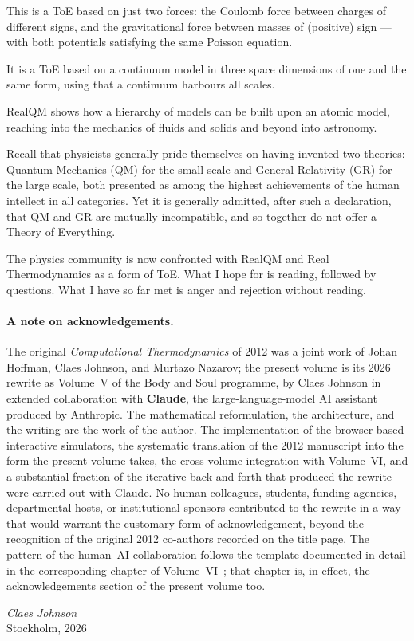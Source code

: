 This is a ToE based on just two forces: the Coulomb force between charges of
different signs, and the gravitational force between masses of (positive) sign
--- with both potentials satisfying the same Poisson equation.

It is a ToE based on a continuum model in three space dimensions of one and the
same form, using that a continuum harbours all scales.

RealQM shows how a hierarchy of models can be built upon an atomic model,
reaching into the mechanics of fluids and solids and beyond into astronomy.

Recall that physicists generally pride themselves on having invented two
theories: Quantum Mechanics (QM) for the small scale and General Relativity
(GR) for the large scale, both presented as among the highest achievements of
the human intellect in all categories. Yet it is generally admitted, after such
a declaration, that QM and GR are mutually incompatible, and so together do not
offer a Theory of Everything.

The physics community is now confronted with RealQM and Real Thermodynamics as a
form of ToE. What I hope for is reading, followed by questions. What I have so
far met is anger and rejection without reading.

\paragraph{A note on acknowledgements.}
The original \emph{Computational Thermodynamics} of 2012 was a joint work of Johan Hoffman, Claes Johnson, and Murtazo Nazarov; the present volume is its 2026 rewrite as Volume~V of the Body and Soul programme, by Claes Johnson in extended collaboration with \textbf{Claude}, the large-language-model AI assistant produced by Anthropic. The mathematical reformulation, the architecture, and the writing are the work of the author. The implementation of the browser-based interactive simulators, the systematic translation of the 2012 manuscript into the form the present volume takes, the cross-volume integration with Volume~VI, and a substantial fraction of the iterative back-and-forth that produced the rewrite were carried out with Claude. No human colleagues, students, funding agencies, departmental hosts, or institutional sponsors contributed to the rewrite in a way that would warrant the customary form of acknowledgement, beyond the recognition of the original 2012 co-authors recorded on the title page. The pattern of the human--AI collaboration follows the template documented in detail in the corresponding chapter of Volume~VI~\cite{RealQM2026}; that chapter is, in effect, the acknowledgements section of the present volume too.

\bigskip

\hfill \emph{Claes Johnson}\\
\hfill Stockholm, 2026

